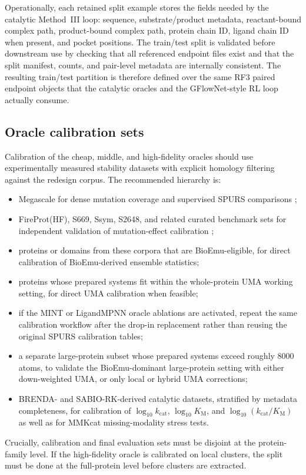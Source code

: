 \documentclass[11pt]{article}
\newcommand{\logkcat}{\ensuremath{\log_{10} k_{\mathrm{cat}}}}
\newcommand{\logKm}{\ensuremath{\log_{10} K_{\mathrm M}}}
\newcommand{\logeff}{\ensuremath{\log_{10}(k_{\mathrm{cat}}/K_{\mathrm M})}}
\begin{document}
	Operationally, each retained split example stores the fields needed by the catalytic Method~III loop: sequence, substrate/product metadata, reactant-bound complex path, product-bound complex path, protein chain ID, ligand chain ID when present, and pocket positions. The train/test split is validated before downstream use by checking that all referenced endpoint files exist and that the split manifest, counts, and pair-level metadata are internally consistent. The resulting train/test partition is therefore defined over the same RF3 paired endpoint objects that the catalytic oracles and the GFlowNet-style RL loop actually consume.
	
	
	\subsection{Oracle calibration sets}
	
	Calibration of the cheap, middle, and high-fidelity oracles should use experimentally measured stability datasets with explicit homology filtering against the redesign corpus. The recommended hierarchy is:
	\begin{itemize}[leftmargin=1.5em]
		\item Megascale for dense mutation coverage and supervised SPURS comparisons \citep{tsuboyama2023megascale,li2026spurs};
		\item FireProt(HF), S669, Ssym, S2648, and related curated benchmark sets for independent validation of mutation-effect calibration \citep{stourac2021fireprotdb,pancotti2022s669,dieckhaus2024thermompnn};
		\item proteins or domains from these corpora that are BioEmu-eligible, for direct calibration of BioEmu-derived ensemble statistics;
		\item proteins whose prepared systems fit within the whole-protein UMA working setting, for direct UMA calibration when feasible;
		\item if the MINT or LigandMPNN oracle ablations are activated, repeat the same calibration workflow after the drop-in replacement rather than reusing the original SPURS calibration tables;
		\item a separate large-protein subset whose prepared systems exceed roughly $8000$ atoms, to validate the BioEmu-dominant large-protein setting with either down-weighted UMA, or only local or hybrid UMA corrections;
		\item BRENDA- and SABIO-RK-derived catalytic datasets, stratified by metadata completeness, for calibration of $\logkcat$, $\logKm$, and $\logeff$ as well as for MMKcat missing-modality stress tests.
	\end{itemize}
	Crucially, calibration and final evaluation sets must be disjoint at the protein-family level. If the high-fidelity oracle is calibrated on local clusters, the split must be done at the full-protein level before clusters are extracted.
	
\end{document}
